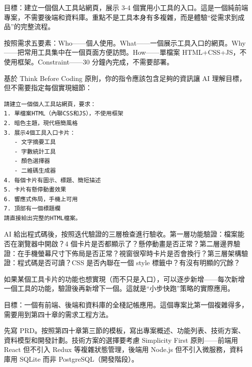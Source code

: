 



目標：建立一個個人工具站網頁，展示 3-4 個實用小工具的入口。這是一個純前端專案，不需要後端和資料庫。重點不是工具本身有多複雜，而是體驗“從需求到成品”的完整流程。

按照需求五要素：Who——個人使用。What——一個展示工具入口的網頁。Why——把常用工具集中在一個頁面方便訪問。How——單檔案 HTML+CSS+JS，不使用框架。Constraint——30 分鐘內完成，不需要部署。


基於 Think Before Coding 原則，你的指令應該包含足夠的資訊讓 AI 理解目標，但不需要指定每個實現細節：

\begin{lstlisting}
請建立一個個人工具站網頁，要求：
1. 單檔案HTML（內聯CSS和JS），不使用框架
2. 暗色主題，現代極簡風格
3. 展示4個工具入口卡片：
   - 文字摘要工具
   - 字數統計工具
   - 顏色選擇器
   - 二維碼生成器
4. 每個卡片有圖示、標題、簡短描述
5. 卡片有懸停動畫效果
6. 響應式佈局，手機上可用
7. 頂部有一個標題欄
請直接給出完整的HTML檔案。
\end{lstlisting}


AI 給出程式碼後，按照迭代驗證的三層檢查進行驗收。第一層功能驗證：檔案能否在瀏覽器中開啟？4 個卡片是否都顯示了？懸停動畫是否正常？第二層邊界驗證：在手機螢幕尺寸下佈局是否正常？視窗很窄時卡片是否會換行？第三層架構驗證：程式碼是否可讀？CSS 是否內聯在一個 style 標籤中？有沒有明顯的冗餘？

如果某個工具卡片的功能也想實現（而不只是入口），可以逐步新增——每次新增一個工具的功能，驗證後再新增下一個。這就是“小步快跑”策略的實際應用。



目標：一個有前端、後端和資料庫的全棧記帳應用。這個專案比第一個複雜得多，需要用到第四十章的需求工程方法。

先寫 PRD。按照第四十章第三節的模板，寫出專案概述、功能列表、技術方案、資料模型和開發計劃。技術方案的選擇要考慮 Simplicity First 原則——前端用 React 但不引入 Redux 等複雜狀態管理，後端用 Node.js 但不引入微服務，資料庫用 SQLite 而非 PostgreSQL（開發階段）。


